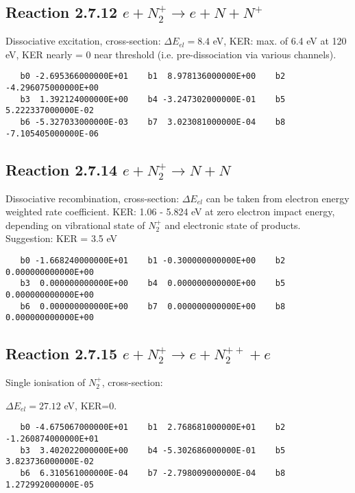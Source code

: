 \documentclass[12pt,dvipdfmx]{article}
\begin{document}
\subsection{
Reaction 2.7.12  $e + N_2^+ \rightarrow e + N + N^+ $ }
Dissociative excitation, cross-section:
\cite{kn:Bahati}
$\Delta E_{el} = 8.4 $ eV, KER: max. of 6.4 eV at 120 eV, KER nearly = 0 near threshold (i.e.
pre-dissociation via various channels).

\begin{small}\begin{verbatim}
   b0 -2.695366000000E+01    b1  8.978136000000E+00    b2 -4.296075000000E+00
   b3  1.392124000000E+00    b4 -3.247302000000E-01    b5  5.222337000000E-02
   b6 -5.327033000000E-03    b7  3.023081000000E-04    b8 -7.105405000000E-06
\end{verbatim}\end{small}

\subsection{
Reaction 2.7.14  $e + N_2^+ \rightarrow N + N$ }
Dissociative recombination, cross-section:
\cite{kn:Petersen}
$\Delta E_{el}$ can be taken from electron energy weighted rate coefficient. KER: 1.06 - 5.824 eV at zero electron impact energy,
depending on vibrational state of $N_2^+$ and electronic state of products. Suggestion: KER = 3.5 eV

\begin{small}\begin{verbatim}
   b0 -1.668240000000E+01    b1 -0.300000000000E+00    b2  0.000000000000E+00
   b3  0.000000000000E+00    b4  0.000000000000E+00    b5  0.000000000000E+00
   b6  0.000000000000E+00    b7  0.000000000000E+00    b8  0.000000000000E+00
\end{verbatim}\end{small}



\subsection{
Reaction 2.7.15  $e + N_2^+ \rightarrow e + N_2^{++} +e$ }
Single ionisation of $N_2^+$, cross-section: \cite{kn:Bahati}

$\Delta E_{el} = 27.12 $ eV,  KER=0.

\begin{small}\begin{verbatim}
   b0 -4.675067000000E+01    b1  2.768681000000E+01    b2 -1.260874000000E+01
   b3  3.402022000000E+00    b4 -5.302686000000E-01    b5  3.823736000000E-02
   b6  6.310561000000E-04    b7 -2.798009000000E-04    b8  1.272992000000E-05
\end{verbatim}\end{small}
\end{document}
